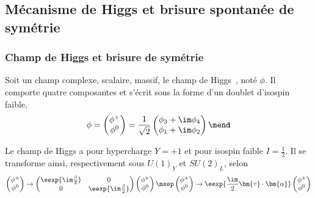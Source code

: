 \subsection{Mécanisme de Higgs et brisure spontanée de symétrie}\label{chapter-MS-MSSM-section-formalisme-subsec-Higgs_mechanism}
\subsubsection{Champ de Higgs et brisure de symétrie}\label{chapter-MS-MSSM-section-formalisme-subsec-Higgs_mechanism-subsubsec-potentiel}
Soit un champ complexe, scalaire, massif, le champ de Higgs~\cite{Englert_Brout,Higgs_1,Higgs_2,Guralnik_Hagen_Kibble,Kibble,Higgs_3}, noté $\phi$.
Il comporte quatre composantes et s'écrit sous la forme d'un doublet d'isospin faible,
\begin{equation}
\phi
=
\begin{pmatrix}
\phi^+ \\ \phi^0
\end{pmatrix}
=
\frac{1}{\sqrt{2}}
\begin{pmatrix}
\phi_3 + \im \phi_4 \\ \phi_1 + \im \phi_2
\end{pmatrix}
\mend
\label{eq-chapter-MS-MSSM-section-formalisme-subsec-Higgs_mechanism-SM_Higgs_doublet}
\end{equation}
\par Le champ de Higgs a pour hypercharge $Y=+1$ et pour isospin faible $I=\frac{1}{2}$. Il se transforme ainsi, respectivement sous $U(1)_Y$ et $SU(2)_L$, selon
\begin{equation}
\begin{pmatrix}
\phi^+ \\ \phi^0
\end{pmatrix}
\to
\begin{pmatrix}
\eexp{\im\frac{\beta}{2}} & 0 \\ 0 & \eexp{\im\frac{\beta}{2}}
\end{pmatrix}
\begin{pmatrix}
\phi^+ \\ \phi^0
\end{pmatrix}
\msep
\begin{pmatrix}
\phi^+ \\ \phi^0
\end{pmatrix}
\to
\eexp{\frac{\im}{2}\bm{\tau}\cdot\bm{\alpha}}
\begin{pmatrix}
\phi^+ \\ \phi^0
\end{pmatrix}
\end{equation}

